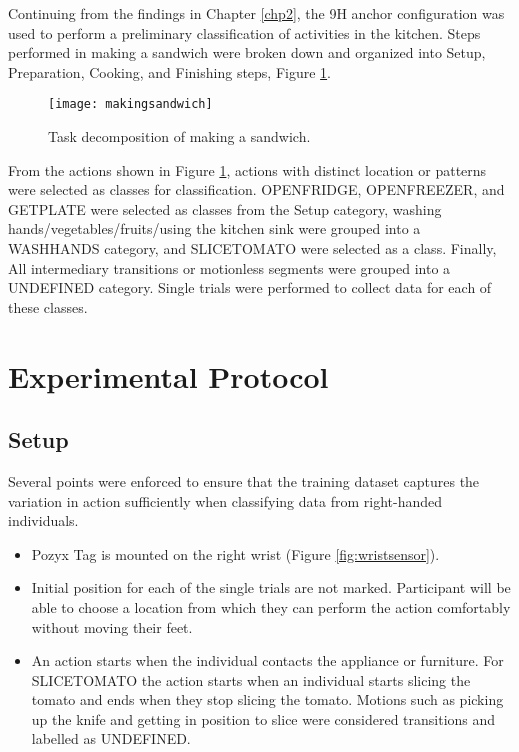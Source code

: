 Continuing from the findings in Chapter \ref{chp2}, the 9H anchor configuration
was used to perform a preliminary classification of activities in the 
kitchen. Steps performed in making a sandwich were broken down and organized
into Setup, Preparation, Cooking, and Finishing steps, Figure \ref{fig:sandwichbreakdown}. 

\begin{figure}[ht]
    \centering
    \texttt{[image: makingsandwich]}
    \caption{Task decomposition of making a sandwich.}
    \label{fig:sandwichbreakdown}
\end{figure}

From the actions shown in Figure \ref{fig:sandwichbreakdown}, actions 
with distinct location or patterns were selected as classes for classification.
OPENFRIDGE, OPENFREEZER, and GETPLATE were selected as classes from the Setup
category, washing hands/vegetables/fruits/using the kitchen sink were grouped 
into a WASHHANDS category, and SLICETOMATO were selected as a class. Finally,
All intermediary transitions or motionless segments were grouped into a 
UNDEFINED category. Single trials were performed to collect data for each of 
these classes. 

\clearpage
\section{Experimental Protocol}
\subsection{Setup}
Several points were enforced to ensure that the training dataset captures
the variation in action sufficiently when classifying data from right-handed individuals.

\begin{itemize}
    \item Pozyx Tag is mounted on the right wrist (Figure \ref{fig:wristsensor}).
    \item Initial position for each of the single trials are not marked. Participant
    will be able to choose a location from which they can perform the action comfortably
    without moving their feet.
    \item An action starts when the individual contacts the appliance or furniture.
    For SLICETOMATO the action starts when an individual starts slicing the 
    tomato and ends when they stop slicing the tomato. Motions such as picking up the
    knife and getting in position to slice were considered transitions and labelled 
    as UNDEFINED. 
\end{itemize}


